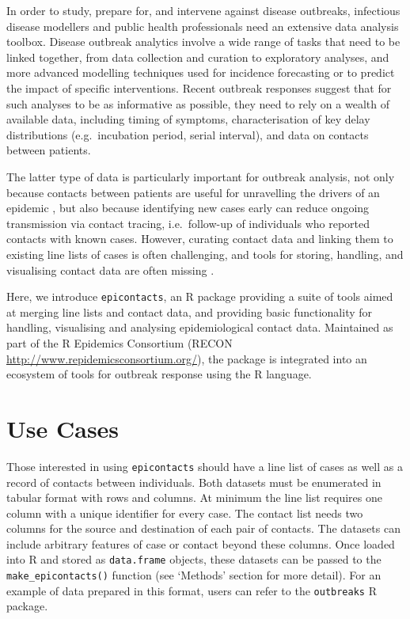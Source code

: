 \documentclass[9pt,a4paper,]{extarticle}
\theoremstyle{definition}
\theoremstyle{definition}
\theoremstyle{definition}
\theoremstyle{remark}
\begin{document}
In order to study, prepare for, and intervene against disease outbreaks, infectious disease modellers and public health professionals need an extensive data analysis toolbox. Disease outbreak analytics involve a wide range of tasks that need to be linked together, from data collection and curation to exploratory analyses, and more advanced modelling techniques used for incidence forecasting\citep{funk:2016}\citep{nouvellet:2017} or to predict the impact of specific interventions\citep{nouvellet:2015}\citep{parker:2015}. Recent outbreak responses suggest that for such analyses to be as informative as possible, they need to rely on a wealth of available data, including timing of symptoms, characterisation of key delay distributions (e.g.~incubation period, serial interval), and data on contacts between patients\citep{cauchemez:2014}\citep{aylward:2014}\citep{agua-agum:2015}\citep{cori:2017}.

The latter type of data is particularly important for outbreak analysis, not only because contacts between patients are useful for unravelling the drivers of an epidemic \citep{agua-agum:2016}\citep{cauchemez:2016}, but also because identifying new cases early can reduce ongoing transmission via contact tracing, i.e.~follow-up of individuals who reported contacts with known cases\citep{senga:2017}\citep{saurabh:2017}. However, curating contact data and linking them to existing line lists of cases is often challenging, and tools for storing, handling, and visualising contact data are often missing \citep{who:2009}\citep{rakesh:2014}.

Here, we introduce \texttt{epicontacts}, an R\citep{rcore} package providing a suite of tools aimed at merging line lists and contact data, and providing basic functionality for handling, visualising and analysing epidemiological contact data. Maintained as part of the R Epidemics Consortium (RECON \url{http://www.repidemicsconsortium.org/}), the package is integrated into an ecosystem of tools for outbreak response using the R language.

\section{Use Cases}\label{use-cases}

Those interested in using \texttt{epicontacts} should have a line list of cases as well as a record of contacts between individuals. Both datasets must be enumerated in tabular format with rows and columns. At minimum the line list requires one column with a unique identifier for every case. The contact list needs two columns for the source and destination of each pair of contacts. The datasets can include arbitrary features of case or contact beyond these columns. Once loaded into R and stored as \texttt{data.frame} objects, these datasets can be passed to the \texttt{make\_epicontacts()} function (see `Methods' section for more detail). For an example of data prepared in this format, users can refer to the \texttt{outbreaks} R package.
\end{document}
